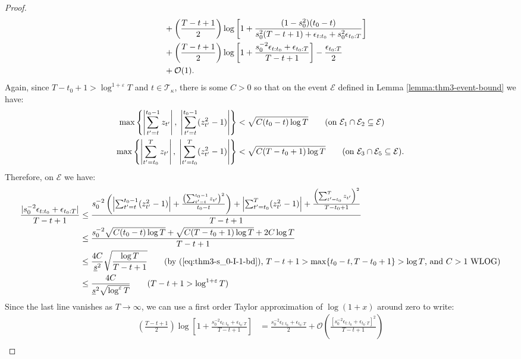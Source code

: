 \begin{proof}
\begin{align}
    &\quad\: + \left(\frac{T - t +1}{2}\right)\log\left[1 + \frac{(1 - s_0^2)(t_0 - t)}{s_0^{2}(T-t+1) + \epsilon_{t:t_0} + s_0^{2}\epsilon_{t_0:T} }\right] \notag \\
    &\quad\: + \left(\frac{T - t +1}{2}\right)\log\left[1 + \frac{s_0^{-2} \epsilon_{t:t_0} + \epsilon_{t_0:T} }{T-t+1}\right] - \frac{\epsilon_{t_0:T}}{2} \notag \\
    &\quad\: + \mathcal{O}(1). \label{eq:thm3-cs2-bd2}
\end{align}
Again, since $T-t_0+1 > \log^{1+\varepsilon} T$ and $t\in\mathcal{T}_\kappa$, there is some $C>0$ so that on the event $\mathcal{E}$ defined in Lemma \ref{lemma:thm3-event-bound} we have:
\begin{align*}
    \max\left\{\left|\sum_{t'=t}^{t_0-1 } z_{t'}\right|,\;\left|\sum_{t'=t}^{t_0-1 } (z^2_{t'}-1)\right|\right\} &< \sqrt{C(t_0-t)\log T} \tag{on $\mathcal{E}_1\cap\mathcal{E}_2\subseteq \mathcal{E}$}\\
    \max\left\{\left|\sum_{t'=t_0}^{T} z_{t'} \right|,\;\left|\sum_{t'=t_0}^{T} (z^2_{t'}-1)\right|\right\} &< \sqrt{C(T-t_0+1)\log T} \tag{on $\mathcal{E}_3\cap \mathcal{E}_5\subseteq \mathcal{E}$}.
\end{align*}
Therefore, on $\mathcal{E}$ we have:
\small
\begin{align*}
    \frac{|s_0^{-2} \epsilon_{t:t_0} + \epsilon_{t_0:T}|}{T-t+1} &\leq \frac{s_0^{-2}\left(\left|\sum_{t'=t}^{t_0-1 } (z^2_{t'}-1)\right| + \frac{\left(\sum_{t'=t}^{t_0-1 } z_{t'}\right)^2}{t_0-t}\right) + \left|\sum_{t'=t_0}^{T} (z^2_{t'}-1)\right| + \frac{\left(\sum_{t'=t_0}^{T} z_{t'} \right)^2}{T-t_0+1}}{T-t+1} \\
    &\leq \frac{s_0^{-2}\sqrt{C(t_0-t)\log T} + \sqrt{C(T-t_0+1)\log T} + 2C\log T}{T-t+1} \\
    &\leq \frac{4C}{\underline{s}^{2}}\sqrt{\frac{\log T}{T-t+1}} \tag{by (\ref{eq:thm3-s_0-I-1-bd}), $T-t+1 > \max\{t_0 - t, T-t_0+1\} > \log T$, and $C > 1$ WLOG} \\
    &\leq \frac{4C}{\underline{s}^2\sqrt{\log^{\varepsilon} T}}  \tag{$T-t+1 > \log^{1+\varepsilon} T$}
\end{align*}
\normalsize
Since the last line vanishes as $T \to \infty$, we can use a first order Taylor approximation of $\log(1+x)$ around zero to write: 
\begin{align*}
    \left(\frac{T - t +1}{2}\right)\log\left[1 + \frac{s_0^{-2} \epsilon_{t:t_0} + \epsilon_{t_0:T} }{T-t+1}\right] &= \frac{s_0^{-2}\epsilon_{t:t_0} + \epsilon_{t_0:T}}{2} + \mathcal{O}\left(\frac{\left[s_0^{-2} \epsilon_{t:t_0} + \epsilon_{t_0:T}\right]^2}{T-t+1}\right) \\

\end{align*}
\end{proof}
